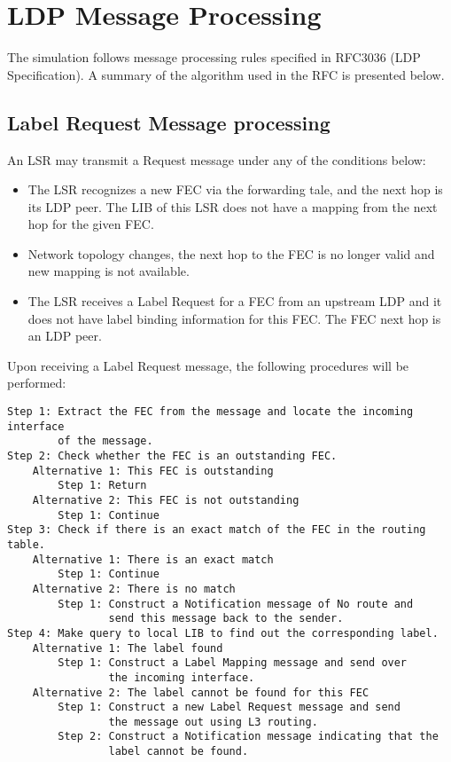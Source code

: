 \section{LDP Message Processing}

The simulation follows message processing rules specified in RFC3036
(LDP Specification). A summary of the algorithm used in the RFC is
presented below.

\subsection{Label Request Message processing}

An LSR may transmit a Request message under any of the conditions below:

\begin{itemize}
  \item The LSR recognizes a new FEC via the forwarding tale, and the next hop
    is its LDP peer. The LIB of this LSR does not have a mapping from the
    next hop for the given FEC.
  \item Network topology changes, the next hop to the FEC is no longer valid
    and new mapping is not available.
  \item The LSR receives a Label Request for a FEC from an upstream LDP and it
    does not have label binding information for this FEC. The FEC next hop
    is an LDP peer.
\end{itemize}

Upon receiving a Label Request message, the following procedures will be
performed:

\begin{verbatim}
Step 1: Extract the FEC from the message and locate the incoming interface
        of the message.
Step 2: Check whether the FEC is an outstanding FEC.
    Alternative 1: This FEC is outstanding
        Step 1: Return
    Alternative 2: This FEC is not outstanding
        Step 1: Continue
Step 3: Check if there is an exact match of the FEC in the routing table.
    Alternative 1: There is an exact match
        Step 1: Continue
    Alternative 2: There is no match
        Step 1: Construct a Notification message of No route and
                send this message back to the sender.
Step 4: Make query to local LIB to find out the corresponding label.
    Alternative 1: The label found
        Step 1: Construct a Label Mapping message and send over
                the incoming interface.
    Alternative 2: The label cannot be found for this FEC
        Step 1: Construct a new Label Request message and send
                the message out using L3 routing.
        Step 2: Construct a Notification message indicating that the
                label cannot be found.
\end{verbatim}

